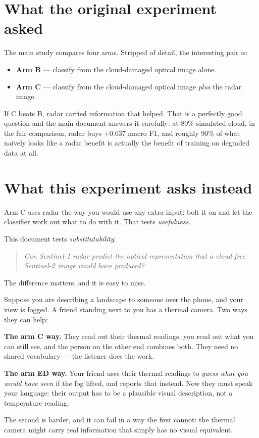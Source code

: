 \documentclass[11pt,a4paper]{report}
\begin{document}
\section{What the original experiment asked}

The main study compares four arms. Stripped of detail, the interesting pair is:

\begin{itemize}
\item \textbf{Arm B} --- classify from the cloud-damaged optical image alone.
\item \textbf{Arm C} --- classify from the cloud-damaged optical image
      \emph{plus} the radar image.
\end{itemize}

If C beats B, radar carried information that helped. That is a perfectly good
question and the main document answers it carefully: at 80\% simulated cloud, in
the fair comparison, radar buys $+0.037$ macro F1, and roughly 90\% of what
naively looks like a radar benefit is actually the benefit of training on
degraded data at all.

\section{What this experiment asks instead}

Arm C uses radar the way you would use any extra input: bolt it on and let the
classifier work out what to do with it. That tests \emph{usefulness}.

This document tests \emph{substitutability}:

\begin{quote}\itshape
Can Sentinel-1 radar predict the optical representation that a cloud-free
Sentinel-2 image would have produced?
\end{quote}

\begin{intuition}
The difference matters, and it is easy to miss.

\medskip
Suppose you are describing a landscape to someone over the phone, and your view
is fogged. A friend standing next to you has a thermal camera. Two ways they can
help:

\medskip
\textbf{The arm C way.} They read out their thermal readings, you read out what
you can still see, and the person on the other end combines both. They need no
shared vocabulary --- the listener does the work.

\medskip
\textbf{The arm ED way.} Your friend uses their thermal readings to
\emph{guess what you would have seen} if the fog lifted, and reports that
instead. Now they must speak your language: their output has to be a
plausible visual description, not a temperature reading.

\medskip
The second is harder, and it can fail in a way the first cannot: the thermal
camera might carry real information that simply has no visual equivalent.
\end{intuition}
\end{document}
